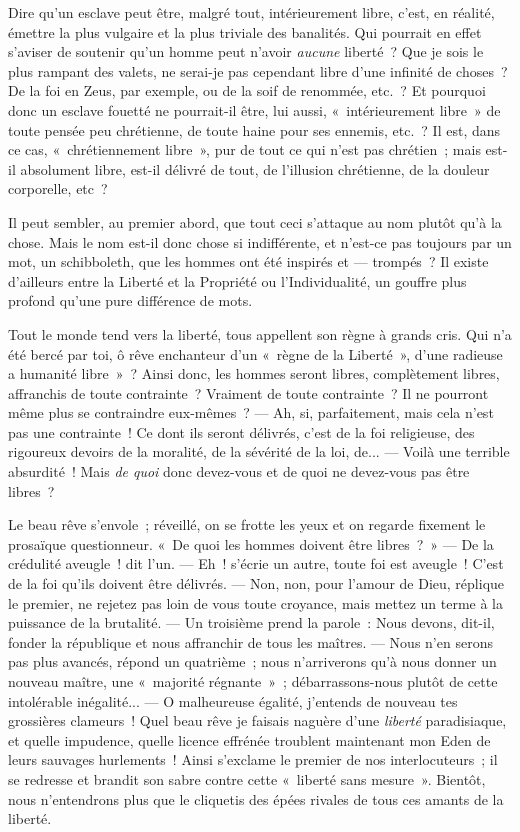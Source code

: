 \documentclass[french,twoside]{book} %
\begin{document}
Dire qu’un esclave peut être, malgré tout, intérieurement libre, c’est, en réalité, émettre la plus vulgaire et la plus triviale des banalités. Qui pourrait en effet s’aviser de soutenir qu’un homme peut n’avoir \emph{aucune} liberté ? Que je sois le plus rampant des valets, ne serai-je pas cependant libre d’une infinité de choses ? De la foi en Zeus, par exemple, ou de la soif de renommée, etc. ? Et pourquoi donc un esclave fouetté ne pourrait-il être, lui aussi, « intérieurement libre » de toute pensée peu chrétienne, de toute haine pour ses ennemis, etc. ? Il est, dans ce cas, « chrétiennement libre », pur de tout ce qui n’est pas chrétien ; mais est-il absolument libre, est-il délivré de tout, de l’illusion chrétienne, de la douleur corporelle, etc ?\par
Il peut sembler, au premier abord, que tout ceci s’attaque au nom plutôt qu’à la chose. Mais le nom est-il donc chose si indifférente, et n’est-ce pas toujours par un mot, un schibboleth, que les hommes ont été inspirés et — trompés ? Il existe d’ailleurs entre la Liberté et la Propriété ou l’Individualité, un gouffre plus profond qu’une pure différence de mots.\par
Tout le monde tend vers la liberté, tous appellent son règne à grands cris. Qui n’a été bercé par toi, ô rêve enchanteur d’un « règne de la Liberté », d’une radieuse a humanité libre » ? Ainsi donc, les  hommes seront libres, complètement libres, affranchis de toute contrainte ? Vraiment de toute contrainte ? Il ne pourront même plus se contraindre eux-mêmes ? — Ah, si, parfaitement, mais cela n’est pas une contrainte ! Ce dont ils seront délivrés, c’est de la foi religieuse, des rigoureux devoirs de la moralité, de la sévérité de la loi, de... — Voilà une terrible absurdité ! Mais \emph{de quoi} donc devez-vous et de quoi ne devez-vous pas être libres ?\par
Le beau rêve s’envole ; réveillé, on se frotte les yeux et on regarde fixement le prosaïque questionneur. « De quoi les hommes doivent être libres ? » — De la crédulité aveugle ! dit l’un. — Eh ! s’écrie un autre, toute foi est aveugle ! C’est de la foi qu’ils doivent être délivrés. — Non, non, pour l’amour de Dieu, réplique le premier, ne rejetez pas loin de vous toute croyance, mais mettez un terme à la puissance de la brutalité. — Un troisième prend la parole : Nous devons, dit-il, fonder la république et nous affranchir de tous les maîtres. — Nous n’en serons pas plus avancés, répond un quatrième ; nous n’arriverons qu’à nous donner un nouveau maître, une « majorité régnante » ; débarrassons-nous plutôt de cette intolérable inégalité... — O malheureuse égalité, j’entends de nouveau tes grossières clameurs ! Quel beau rêve je faisais naguère d’une \emph{liberté} paradisiaque, et quelle impudence, quelle licence effrénée troublent maintenant mon Eden de leurs sauvages hurlements ! Ainsi s’exclame le premier de nos interlocuteurs ; il se redresse et brandit son sabre contre cette « liberté sans mesure ». Bientôt, nous n’entendrons plus que le cliquetis des épées rivales de tous ces amants de la liberté.\par
\end{document}
